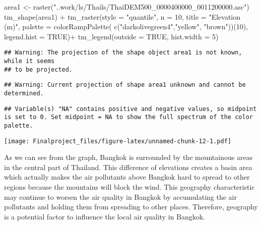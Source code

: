 \documentclass[
]{article}
\newenvironment{Shaded}{\begin{snugshade}}{\end{snugshade}}
\newcommand{\AttributeTok}[1]{\textcolor[rgb]{0.77,0.63,0.00}{#1}}
\newcommand{\ConstantTok}[1]{\textcolor[rgb]{0.00,0.00,0.00}{#1}}
\newcommand{\DecValTok}[1]{\textcolor[rgb]{0.00,0.00,0.81}{#1}}
\newcommand{\FunctionTok}[1]{\textcolor[rgb]{0.00,0.00,0.00}{#1}}
\newcommand{\NormalTok}[1]{#1}
\newcommand{\OtherTok}[1]{\textcolor[rgb]{0.56,0.35,0.01}{#1}}
\newcommand{\SpecialCharTok}[1]{\textcolor[rgb]{0.00,0.00,0.00}{#1}}
\newcommand{\StringTok}[1]{\textcolor[rgb]{0.31,0.60,0.02}{#1}}
\begin{document}
\begin{Shaded}
\begin{Highlighting}[]
\NormalTok{area1 }\OtherTok{\textless{}{-}} \FunctionTok{raster}\NormalTok{(}\StringTok{"..work/ls/Thails/ThaiDEM500\_0000400000\_0011200000.asc"}\NormalTok{)}
\FunctionTok{tm\_shape}\NormalTok{(area1) }\SpecialCharTok{+}
  \FunctionTok{tm\_raster}\NormalTok{(}\AttributeTok{style =} \StringTok{"quantile"}\NormalTok{, }\AttributeTok{n =} \DecValTok{10}\NormalTok{, }\AttributeTok{title =} \StringTok{"Elevation (m)"}\NormalTok{,}
            \AttributeTok{palette =} \FunctionTok{colorRampPalette}\NormalTok{( }\FunctionTok{c}\NormalTok{(}\StringTok{"darkolivegreen4"}\NormalTok{,}\StringTok{"yellow"}\NormalTok{, }\StringTok{"brown"}\NormalTok{))(}\DecValTok{10}\NormalTok{),}
            \AttributeTok{legend.hist =} \ConstantTok{TRUE}\NormalTok{)}\SpecialCharTok{+}
  \FunctionTok{tm\_legend}\NormalTok{(}\AttributeTok{outside =} \ConstantTok{TRUE}\NormalTok{, }\AttributeTok{hist.width =} \DecValTok{5}\NormalTok{)}
\end{Highlighting}
\end{Shaded}

\begin{verbatim}
## Warning: The projection of the shape object area1 is not known, while it seems
## to be projected.
\end{verbatim}

\begin{verbatim}
## Warning: Current projection of shape area1 unknown and cannot be determined.
\end{verbatim}

\begin{verbatim}
## Variable(s) "NA" contains positive and negative values, so midpoint is set to 0. Set midpoint = NA to show the full spectrum of the color palette.
\end{verbatim}

\texttt{[image: Finalproject\_files/figure-latex/unnamed-chunk-12-1.pdf]}

As we can see from the graph, Bangkok is surrounded by the mountainous
areas in the central part of Thailand. This difference of elevations
creates a basin area which actually makes the air pollutants above
Bangkok hard to spread to other regions because the mountains will block
the wind. This geography characteristic may continue to worsen the air
quality in Bangkok by accumulating the air pollutants and holding them
from spreading to other places. Therefore, geography is a potential
factor to influence the local air quality in Bangkok.
\end{document}

